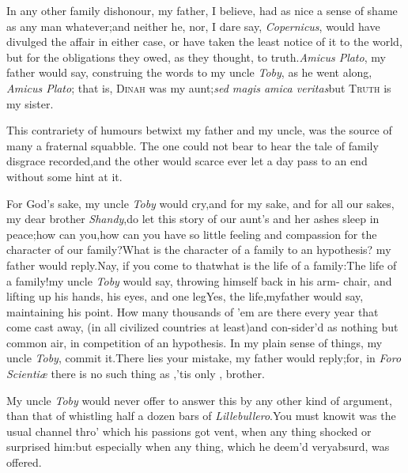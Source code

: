 \documentclass{article}
\begin{document}
In any other family dishonour, my father, I believe, had as nice
a sense of shame as any man whatever;\tsh  and neither he,
nor, I dare say, \textit{Copernicus}, would have divulged the affair
in either case, or have taken the least notice of it to the world,
but for the obligations they owed, as they thought, to truth.\tsk\break  \textit{Amicus
Plato}, my father would say, construing the words to my uncle
\textit{Toby}, as he went along, \textit{Amicus Plato}; that is,
\textsc{Dinah} was my aunt;\tsk  \textit{sed magis amica
veritas}\tsk  but \textsc{Truth} is my sister.

\newpage
This contrariety of humours betwixt my father and my uncle, was
the source of many a fraternal squabble. The one could not bear to
hear the tale of family disgrace recorded,\tsh  and the
other would scarce ever let a day pass to an end without some hint
at it.

For God’s sake, my uncle \textit{Toby} would
cry,\tsh  and for my sake, and for all our sakes, my dear
brother \textit{Shandy},\tsk  do let this story of our aunt’s
and her ashes sleep in peace;\tsh  how can
you,\tsh\break  how can you have so little feeling and compassion
for the character of our family?\tsh  What is the character
of a family to an hypothesis? my father would
reply.\tsh  Nay, if you come to that\tsk\break  what is the
life of a family:\tsh  The life of a family!\tsk  my uncle
\textit{Toby} would say, throwing himself back in his arm-\pb
chair, and
lifting up his hands, his eyes, and one
leg\tsh  Yes, the life,\tsh  my\break father would say,
maintaining his point. How many thousands of ’em are there
every year that come cast away, (in all civilized countries at
least)\tsh  and con-\break sider’d as nothing but common air, in
competition of an hypothesis. In my plain sense of things, my uncle
\textit{Toby},\break 
{}
commit it.\tsh  There
lies your mistake, my father would reply;\tsh  for, in
\textit{Foro Scientiæ} there is no such thing as
,\tsh  ’tis only
, brother.

My uncle \textit{Toby} would never offer to answer this by any
other kind of argument, than that of whistling half a dozen bars of
\textit{Lillebullero}.\tsh  You must know\pb it was the usual
channel thro’ which his passions got vent, when any thing
shock\-ed or surprised him:\tsh  but especially when any
thing, which he deem’d very\break absurd, was offered.
\end{document}

